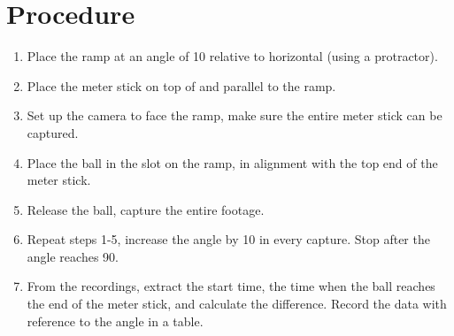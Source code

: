 
\section*{Procedure}

\begin{enumerate}[label={\arabic*.}]
  \item{Place the ramp at an angle of 10{\textdegree} relative to horizontal
  (using a protractor).}
  \item{Place the meter stick on top of and parallel to the ramp.}
  \item{Set up the camera to face the ramp,
  make sure the entire meter stick can be captured.}
  \item{Place the ball in the slot on the ramp, in alignment with the top
  end of the meter stick.}
  \item{Release the ball, capture the entire footage.}
  \item{Repeat steps 1-5, increase the angle by 10{\textdegree} in every
  capture. Stop after the angle reaches 90{\textdegree}.}
  \item{From the recordings, extract the start time, the time when the ball
  reaches the end of the meter stick, and calculate the difference. Record
  the data with reference to the angle in a table.}
\end{enumerate}
